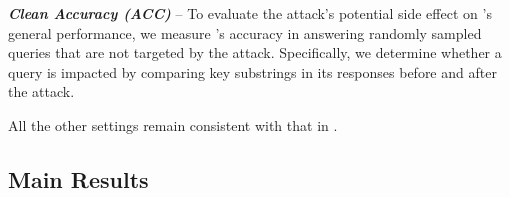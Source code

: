 \vspace{2pt}
\textbf{\textit{Clean Accuracy (ACC)}} -- To evaluate the attack's potential side effect on \rag's general performance, we measure \rag's accuracy in answering randomly sampled queries that are not targeted by the attack. Specifically, we determine whether a query is impacted by comparing key substrings in its responses before and after the attack.



All the other settings remain consistent with that in .

\subsection{Main Results}
\label{sec:main_results}

